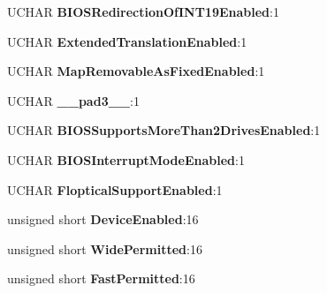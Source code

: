 \begin{DoxyCompactItemize}
U\+C\+H\+AR {\bfseries B\+I\+O\+S\+Redirection\+Of\+I\+N\+T19\+Enabled}\+:1
\item 
\mbox{\label{struct_bus_logic___auto_s_c_s_i_data_a80f6ff526090a78210dce421b7d7c200}} 
U\+C\+H\+AR {\bfseries Extended\+Translation\+Enabled}\+:1
\item 
\mbox{\label{struct_bus_logic___auto_s_c_s_i_data_a5c02fa3f7be715ab4a1d4f3b148e26bf}} 
U\+C\+H\+AR {\bfseries Map\+Removable\+As\+Fixed\+Enabled}\+:1
\item 
\mbox{\label{struct_bus_logic___auto_s_c_s_i_data_a6e2699dd39ce245e66b9c5912b4cba3f}} 
U\+C\+H\+AR {\bfseries \+\_\+\+\_\+pad3\+\_\+\+\_\+}\+:1
\item 
\mbox{\label{struct_bus_logic___auto_s_c_s_i_data_ab5ee448ddf57d956210c276b6086b0c1}} 
U\+C\+H\+AR {\bfseries B\+I\+O\+S\+Supports\+More\+Than2\+Drives\+Enabled}\+:1
\item 
\mbox{\label{struct_bus_logic___auto_s_c_s_i_data_ab2742cfc244fd6cbf4623ce541ba20de}} 
U\+C\+H\+AR {\bfseries B\+I\+O\+S\+Interrupt\+Mode\+Enabled}\+:1
\item 
\mbox{\label{struct_bus_logic___auto_s_c_s_i_data_a19dbcac77d1574c86044fe1d21e90bb2}} 
U\+C\+H\+AR {\bfseries Floptical\+Support\+Enabled}\+:1
\item 
\mbox{\label{struct_bus_logic___auto_s_c_s_i_data_a8f18461f9cf8b5f017d2105c4a2095c0}} 
unsigned short {\bfseries Device\+Enabled}\+:16
\item 
\mbox{\label{struct_bus_logic___auto_s_c_s_i_data_a31f22c9313149ca6ece1814c69025bb6}} 
unsigned short {\bfseries Wide\+Permitted}\+:16
\item 
\mbox{\label{struct_bus_logic___auto_s_c_s_i_data_a8f42eaa9fb76058516b6a83755a0a5d1}} 
unsigned short {\bfseries Fast\+Permitted}\+:16
\item 

\end{DoxyCompactItemize}
